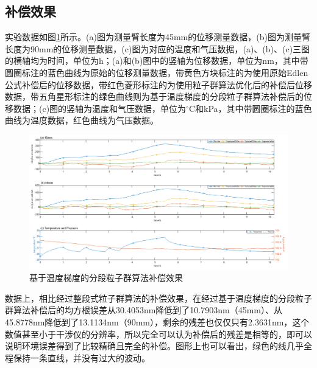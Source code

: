 \subsection{补偿效果}
实验数据如图\ref{fig:基于温度梯度的分段粒子群算法补偿效果}所示。(a)图为测量臂长度为45mm的位移测量数据，(b)图为测量臂长度为90mm的位移测量数据，(c)图为对应的温度和气压数据，(a)、(b)、(c)三图的横轴均为时间，单位为h；(a)和(b)图中的竖轴为位移数据，单位为nm，其中带圆圈标注的蓝色曲线为原始的位移测量数据，带黄色方块标注的为使用原始Edlen公式补偿后的位移数据，带红色菱形标注的为使用粒子群算法优化后的补偿后位移数据，带五角星形标注的绿色曲线则为基于温度梯度的分段粒子群算法补偿后的位移数据；(c)图的竖轴为温度和气压数据，单位为$^{\circ} \mathrm{C}$和kPa，其中带圆圈标注的蓝色曲线为温度数据，红色曲线为气压数据。

\begin{figure}[htb]
  \centering
  \includegraphics[width=14cm]{fig/4-fig/基于温度梯度的分段粒子群算法补偿效果.jpg}
  \caption{基于温度梯度的分段粒子群算法补偿效果}
  \label{fig:基于温度梯度的分段粒子群算法补偿效果}
\end{figure}

数据上，相比经过整段式粒子群算法的补偿效果，在经过基于温度梯度的分段粒子群算法补偿后的均方根误差从30.4053nm降低到了10.7903nm（45mm）、从45.8778nm降低到了13.1134nm（90mm），剩余的残差也仅仅只有2.3631nm，这个数值甚至小于干涉仪的分辨率，所以完全可以认为补偿后的残差是相等的，即可以说明环境误差得到了比较精确且完全的补偿。图形上也可以看出，绿色的线几乎全程保持一条直线，并没有过大的波动。

